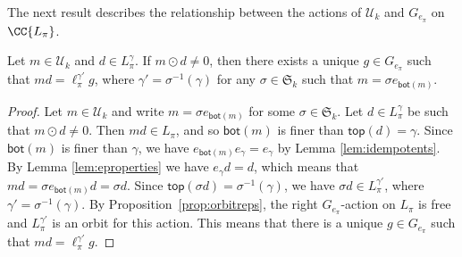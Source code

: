 The next result describes the relationship between the actions of
$\mathcal{U}_k$ and $G_{e_\pi}$ on $\CC{L_\pi}$.
\begin{prop}\label{prop:GeactiononL}
Let $m\in \mathcal{U}_k$ and $d\in L_\pi^\gamma$. If $m \odot d \neq 0$,
then there exists a unique $g \in G_{e_\pi}$  such that $md = \ell_\pi^{\gamma'} g$,
where $\gamma' = \sigma^{-1}(\gamma)$ for any $\sigma \in \mathfrak{S}_k$ such that $m = \sigma e_{\mathsf{bot}(m)}$.
\end{prop}
\begin{proof}
Let $m\in \mathcal{U}_k$ and write $m = \sigma e_{\mathsf{bot}(m)}$ for some $\sigma \in \mathfrak{S}_k$.
Let $d\in L_\pi^\gamma$ be such that $m \odot d \neq 0$.
Then $md \in L_\pi$, and so $\mathsf{bot}(m)$ is finer than $\mathsf{top}(d) = \gamma$.
Since $\mathsf{bot}(m)$ is finer than $\gamma$, we have $e_{\mathsf{bot}(m)} e_\gamma = e_\gamma$ by Lemma \ref{lem:idempotents}.
By Lemma \ref{lem:eproperties} we have $e_\gamma d = d$, which means that $md = \sigma e_{\mathsf{bot}(m)} d = \sigma d$.
Since $\mathsf{top}(\sigma d) = \sigma^{-1}(\gamma)$, we have $\sigma d \in L_\pi^{\gamma'}$, where $\gamma' = \sigma^{-1}(\gamma)$.
By Proposition~\ref{prop:orbitreps},
the right $G_{e_\pi}$-action on $L_\pi$ is free and $L_\pi^{\gamma'}$ is an orbit for this action.
This means that there is a unique $g\in G_{e_\pi}$ such that $m d = \ell_\pi^{\gamma'} g$.
\end{proof}

